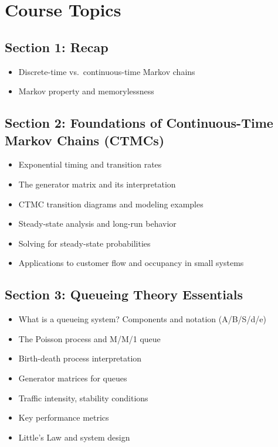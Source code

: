 \documentclass[
]{article}
\providecommand{\tightlist}{%
  \setlength{\itemsep}{0pt}\setlength{\parskip}{0pt}}\usepackage{longtable,booktabs,array}
\begin{document}
\section{Course Topics}\label{course-topics}

\subsection{Section 1: Recap}\label{section-1-recap}

\begin{itemize}
\tightlist
\item
  Discrete-time vs.~continuous-time Markov chains
\item
  Markov property and memorylessness
\end{itemize}

\subsection{Section 2: Foundations of Continuous-Time Markov Chains
(CTMCs)}\label{section-2-foundations-of-continuous-time-markov-chains-ctmcs}

\begin{itemize}
\tightlist
\item
  Exponential timing and transition rates
\item
  The generator matrix and its interpretation
\item
  CTMC transition diagrams and modeling examples
\item
  Steady-state analysis and long-run behavior
\item
  Solving for steady-state probabilities
\item
  Applications to customer flow and occupancy in small systems
\end{itemize}

\subsection{Section 3: Queueing Theory
Essentials}\label{section-3-queueing-theory-essentials}

\begin{itemize}
\tightlist
\item
  What is a queueing system? Components and notation (A/B/S/d/e)
\item
  The Poisson process and M/M/1 queue
\item
  Birth-death process interpretation
\item
  Generator matrices for queues
\item
  Traffic intensity, stability conditions
\item
  Key performance metrics
\item
  Little's Law and system design
\end{itemize}
\end{document}

